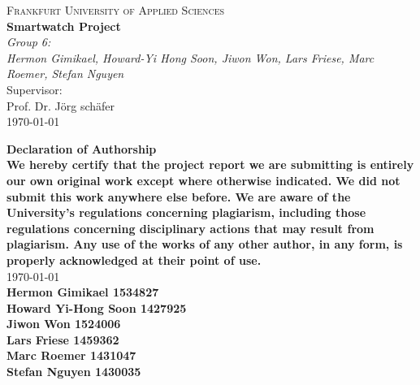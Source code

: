 \documentclass{article}
\begin{document}
\begin{titlepage}
    \centering
    \vspace*{0cm}
    {\scshape\Large Frankfurt University of Applied Sciences}\\[3cm]
    {\huge\bfseries Smartwatch Project}\\[8cm]
    {\Large\itshape Group 6:}\\
    {\Large\itshape Hermon Gimikael, Howard-Yi Hong Soon, Jiwon Won, Lars Friese, Marc Roemer, Stefan Nguyen}\\[4cm]
    Supervisor:\\
    Prof. Dr. Jörg schäfer\\[3cm]
    {\large \today}
\end{titlepage}

\begin{center}
    {\huge \textbf{Declaration of Authorship}\\}\vspace{20pt}
	{\normalsize \textbf{We hereby certify that the project report we are submitting is entirely our own original work except where otherwise indicated. We did not submit this work anywhere else before. We are aware of the University's regulations concerning plagiarism, including those regulations concerning disciplinary actions that may result from plagiarism. Any use of the works of any other author, in any form, is properly acknowledged at their point of use.}\\}\vspace{20pt}
	{\large \today\\}\vspace{20pt}
	{\normalsize \textbf{Hermon Gimikael 1534827}\\}
	{\normalsize \textbf{Howard Yi-Hong Soon 1427925}\\}
	{\normalsize \textbf{Jiwon Won 1524006}\\}
	{\normalsize \textbf{Lars Friese 1459362}\\}
	{\normalsize \textbf{Marc Roemer 1431047}\\}
	{\normalsize \textbf{Stefan Nguyen 1430035}\\}
\end{center}
\end{document}
